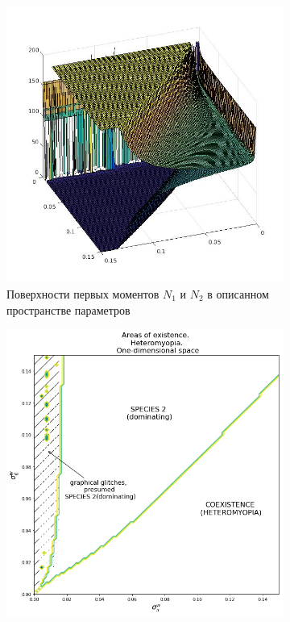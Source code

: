 \begin{figure}[ht]
	\centering
	\begin{subfigure}{.5\textwidth}
		\centering
		\includegraphics[width=.93\linewidth]{N1N2hm08D1.jpg}
		\caption{Поверхности первых моментов \(N_1\) и \(N_2\) в описанном пространстве параметров}
		\label{fig:hmd1:sub1}
	\end{subfigure}%
	\begin{subfigure}{.5\textwidth}
		\centering
		\includegraphics[width=.93\linewidth]{arhm08d1.png}

\end{subfigure}
\end{figure}

